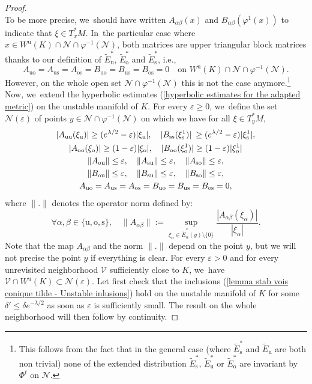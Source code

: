 \documentclass[11pt]{article}
\newcommand{\ie}{i.e.,\xspace}
\newcommand{\ro}{\mathrm{o}}
\newcommand{\rs}{\mathrm{s}}
\newcommand{\rso}{\mathrm{so}}
\newcommand{\ru}{\mathrm{u}}
\newcommand{\ruo}{\mathrm{uo}}
\theoremstyle{definition}
\theoremstyle{plain}
\newcommand{\Ncal}{\mathcal{N}}
\newcommand{\Vcal}{\mathcal{V}}
\begin{document}
\begin{proof}
\[\]
To be more precise, we~should have written $A_{\alpha \beta} (x)$ and $B_{\alpha \beta} (\varphi^1(x))$ to indicate that $\xi \in T_x^* M$. In~the particular case where $x \in W^\ru (K) \cap \Ncal \cap \varphi^{-1}(\Ncal)$, both matrices are upper triangular block matrices thanks to our definition of $\widetilde{E}_\ru^*$, $\widetilde{E}_\ro^*$ and $\widetilde{E}_\rs^*$, \ie
\[
A_{\ruo} = A_{\ru\rs} = A_{\ro\rs} = B_{\ruo} = B_{\ru\rs} = B_{\ro\rs} = 0 \quad\text{on }W^\ru (K) \cap \Ncal \cap \varphi^{-1}(\Ncal).
\]
However, on the whole open set $\Ncal \cap \varphi^{-1}(\Ncal)$ this is not the case anymore.\footnote{This follows from the fact that in the general case (where $\widetilde{E}_\rs^*$ and $\widetilde{E}_\ru$ are both non trivial) none of the extended distribution $\widetilde{E}_\rs^*$, $\widetilde{E}_\ru^*$ or $\widetilde{E}_\ro^*$ are invariant by $\Phi^t$ on $\Ncal$.} Now, we~extend the hyperbolic estimates (\ref{hyperbolic estimates for the adapted metric}) on the unstable manifold of $K$. For every $\varepsilon \geq 0$, we~define the set $\Ncal(\varepsilon)$ of points $y \in \Ncal \cap \varphi^{-1}(\Ncal)$ on which we have for all $\xi \in T_{y}^* M$,
\begin{gather}
|A_{\ru\ru} (\xi_\ru)| \geq (e^{\lambda/2 }-\varepsilon) |\xi_\ru|, \quad |B_{\rs\rs} (\xi_\rs^1)| \: \geq (e^{\lambda/2 } - \varepsilon) |\xi_\rs^1|,
\notag\\
\label{eq perturbe: lemme stabilite vois conique tilde - estimées matrices}
|A_{\ro\ro} (\xi_\ro)| \geq (1 - \varepsilon) |\xi_\ro|, \quad |B_{\ro\ro} (\xi_\ro^1)| \geq (1 - \varepsilon) |\xi_\ro^1|
\\
\notag
\| A_{\ro\ru} \| \leq \varepsilon, \quad \| A_{\rs\ru} \| \leq \varepsilon, \quad \| A_{\rso} \| \leq \varepsilon,\\
\notag
\| B_{\ro\ru} \| \leq \varepsilon, \quad \| B_{\rs\ru} \| \leq \varepsilon, \quad \| B_{\rso} \| \leq \varepsilon, \\
\notag
A_{\ruo} = A_{\ru\rs} = A_{\ro\rs} = B_{\ruo} = B_{\ru\rs} = B_{\ro\rs} = 0,
\end{gather}
where $\|. \|$ denotes the operator norm defined by:
\[
\forall \alpha, \beta \in \{\ru,\ro,\rs\}, \quad \| A_{\alpha \beta} \|:= \sup_{\xi_{\alpha} \in \widetilde{E}_{\alpha}^* (y) \setminus \{0 \}} \frac{|A_{\alpha \beta} (\xi_{\alpha})|}{ |\xi_{\alpha}|}.
\]
Note that the map $A_{\alpha \beta}$ and the norm $\|.\|$ depend on the point $y$, but we will not precise the point $y$ if everything is clear. For every $\varepsilon > 0$ and for every unrevisited neighborhood $\Vcal$ sufficiently close to $K$, we~have $\Vcal \cap W^\ru (K) \subset \Ncal (\varepsilon)$. Let first check that the inclusions (\ref{lemma stab vois conique tilde - Unstable inlusions}) hold on the unstable manifold of $K$ for some $\delta' \leq \delta e^{-\lambda/2}$ as soon as $\varepsilon$ is sufficiently small. The result on the whole neighborhood will then follow by continuity.


\end{proof}
\end{document}
